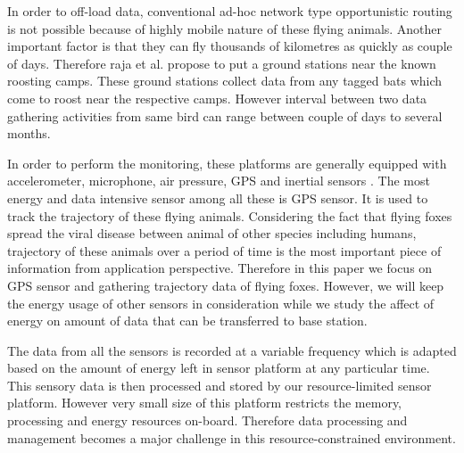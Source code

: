 \documentclass[conference]{IEEEtran}
\begin{document}
In order to off-load data, conventional ad-hoc network type opportunistic routing is not 
possible because of highly mobile nature of these flying animals. Another important factor 
is that they can fly thousands of kilometres as quickly as couple of days. Therefore raja et 
al.\cite{raja-ipsn} propose to put a ground stations near the known roosting camps. These 
ground stations collect data from any tagged bats which come to roost near the respective camps. 
However interval between two data gathering activities from same bird can range between couple 
of days to several months. \ %

In order to perform the monitoring, these platforms are generally equipped with accelerometer, 
microphone, air pressure, GPS and inertial sensors \cite{raja-ipsn}. The most energy and data 
intensive sensor among all these is GPS sensor. It is used to track the trajectory of these 
flying animals. Considering the fact that flying foxes spread the viral disease between animal 
of other species including humans, trajectory of these animals over a period of time is the most 
important piece of information from application perspective. Therefore in this paper we focus 
on GPS sensor and gathering trajectory data of flying foxes. However, we will keep the energy 
usage of other sensors in consideration while we study the affect of energy on amount of data 
that can be transferred to base station.\

 The data from all the sensors is recorded at a variable frequency which is adapted based on 
 the amount of energy left in sensor platform at any particular time. This sensory data is then 
 processed and stored by our resource-limited sensor platform. However very small size of this 
 platform restricts the memory, processing and energy resources on-board. Therefore data 
 processing and management becomes a major challenge in this resource-constrained environment. 
\end{document}
